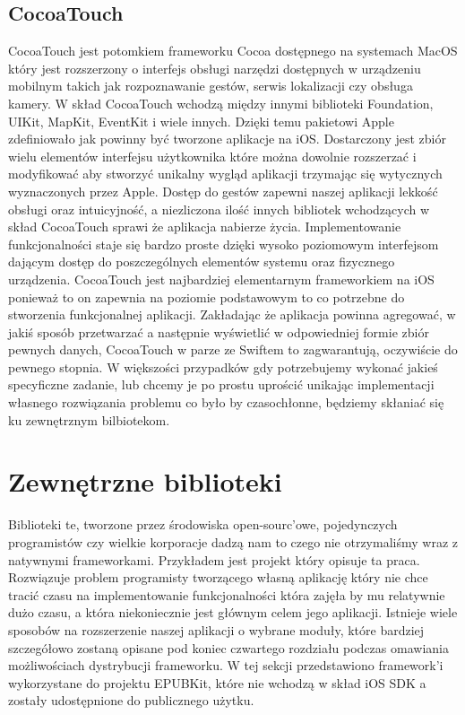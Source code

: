 \subsection{CocoaTouch}

CocoaTouch jest potomkiem frameworku Cocoa dostępnego na systemach MacOS który jest rozszerzony o interfejs obsługi narzędzi dostępnych w urządzeniu mobilnym takich jak rozpoznawanie gestów, serwis lokalizacji czy obsługa kamery. W skład CocoaTouch wchodzą między innymi biblioteki Foundation, UIKit, MapKit, EventKit i wiele innych. Dzięki temu pakietowi Apple zdefiniowało jak powinny być tworzone aplikacje na iOS. Dostarczony jest zbiór wielu elementów interfejsu użytkownika które można dowolnie rozszerzać i modyfikować aby stworzyć unikalny wygląd aplikacji trzymając się wytycznych wyznaczonych przez Apple. Dostęp do gestów zapewni naszej aplikacji lekkość obsługi oraz intuicyjność, a niezliczona ilość innych bibliotek wchodzących w skład CocoaTouch sprawi że aplikacja nabierze życia. Implementowanie funkcjonalności staje się bardzo proste dzięki wysoko poziomowym interfejsom dającym dostęp do poszczególnych elementów systemu oraz fizycznego urządzenia. CocoaTouch jest najbardziej elementarnym frameworkiem na iOS ponieważ to on zapewnia na poziomie podstawowym to co potrzebne do stworzenia funkcjonalnej aplikacji. Zakładając że aplikacja powinna agregować, w jakiś sposób przetwarzać a następnie wyświetlić w odpowiedniej formie zbiór pewnych danych, CocoaTouch w parze ze Swiftem to zagwarantują, oczywiście do pewnego stopnia. W większości przypadków gdy potrzebujemy wykonać jakieś specyficzne zadanie, lub chcemy je po prostu uprościć unikając implementacji własnego rozwiązania problemu co było by czasochłonne, będziemy skłaniać się ku zewnętrznym bilbiotekom.

\section{Zewnętrzne biblioteki}

Biblioteki te, tworzone przez środowiska open-sourc’owe, pojedynczych programistów czy wielkie korporacje dadzą nam to czego nie otrzymaliśmy wraz z natywnymi frameworkami. Przykładem jest projekt który opisuje ta praca. Rozwiązuje problem programisty tworzącego własną aplikację który nie chce tracić czasu na implementowanie funkcjonalności która zajęła by mu relatywnie dużo czasu, a która niekoniecznie jest głównym celem jego aplikacji. Istnieje wiele sposobów na rozszerzenie naszej aplikacji o wybrane moduły, które bardziej szczegółowo zostaną opisane pod koniec czwartego rozdziału podczas omawiania możliwościach dystrybucji frameworku. W tej sekcji przedstawiono framework'i wykorzystane do projektu EPUBKit, które nie wchodzą w skład iOS SDK a zostały udostępnione do publicznego użytku.

